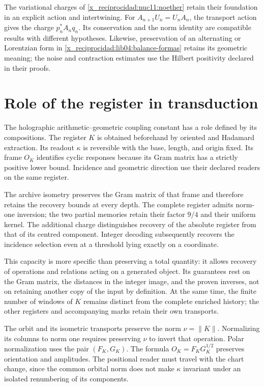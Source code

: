 The variational charges of \cref{x_reciprocidad:nuc11:noether} retain their
foundation in an explicit action and intertwining. For
\(A_{n+1}U_n=U_nA_n\), the transport action gives the charge
\(p_n^*A_nq_n\). Its conservation and the norm identity are
compatible results with different hypotheses. Likewise,
preservation of an alternating or Lorentzian form in
\eqref{x_reciprocidad:lib04:balance-formas} retains its geometric meaning;
the noise and contraction estimates use the Hilbert
positivity declared in their proofs.

\section{Role of the register in transduction}
\label{x_reciprocidad:lib06:registro}

The holographic arithmetic--geometric coupling constant has
a role defined by its compositions. The register \(K\)
is obtained beforehand by oriented and Hadamard extraction.
Its readout \(\kappa\) is reversible with the base, length, and origin
fixed. Its frame \(O_K\) identifies cyclic responses because
its Gram matrix has a strictly positive lower bound. Incidence
and geometric direction use their declared readers
on the same register.

The archive isometry preserves the Gram matrix of that frame and therefore
retains the recovery bounds at every depth. The
complete register admits norm-one inversion; the two partial
memories retain their factor \(9/4\) and their uniform kernel. The
additional charge distinguishes recovery of the absolute register from
that of its centred component. Integer decoding subsequently recovers
the incidence selection even at a threshold lying
exactly on a coordinate.

This capacity is more specific than preserving a total quantity:
it allows recovery of operations and relations acting on a
generated object. Its guarantees rest on the Gram matrix, the
distances in the integer image, and the proven inverses, not
on retaining another copy of the input by definition. At the same time,
the finite number of windows of \(K\) remains distinct from the
complete enriched history; the other registers and accompanying
marks retain their own transports.

The orbit and its isometric transports preserve the norm
\(\nu=\|K\|\). Normalizing its columns to norm one requires
preserving \(\nu\) to invert that operation. Polar
normalization uses the pair
\((F_K,G_K)\). The formula
\(O_K=F_KG_K^{1/2}\) preserves orientation and amplitudes.
The positional reader must travel with the chart change, since the
common orbital norm does not make \(\kappa\) invariant under an
isolated renumbering of its components.

